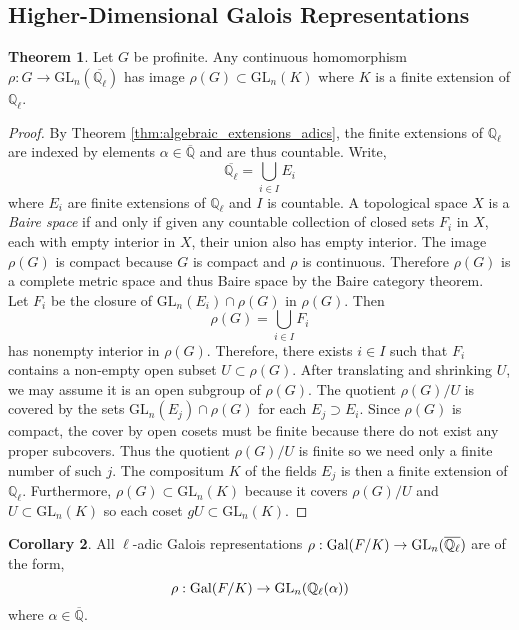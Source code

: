 \documentclass[12pt]{article}
\newcommand{\Q}{\mathbb{Q}}
\newcommand{\Gal}[1]{\mathrm{Gal} \small(#1 \small)}
\newcommand{\GL}[2]{\mathrm{GL}_{#1}(#2)}
\theoremstyle{remark}
\theoremstyle{definition}
\newtheorem{theorem}{Theorem}[section]
\newtheorem{corollary}[theorem]{Corollary}
\begin{document}
\subsection{Higher-Dimensional Galois Representations}

\begin{theorem}
Let $G$ be profinite. Any continuous homomorphism $\rho : G \to \GL{n}{\overline{\Q_{\ell}}}$ has image $\rho(G) \subset \GL{n}{K}$ where $K$ is a finite extension of $\Q_{\ell}$.  
\end{theorem}

\begin{proof}
By Theorem \ref{thm:algebraic_extensions_adics}, the finite extensions of $\Q_{\ell}$ are indexed by elements $\alpha \in \overline{\Q}$ and are thus countable. Write,
\[ \overline{\Q_{\ell}} = \bigcup_{i \in I} E_i \]
where $E_i$ are finite extensions of $\Q_{\ell}$ and $I$ is countable. A topological space $X$ is a \textit{Baire space} if and only if
given any countable collection of closed sets $F_i$ in $X$, each with empty interior in $X$, their union also has empty interior. The image $\rho(G)$ is compact because $G$ is compact and $\rho$ is continuous. Therefore $\rho(G)$ is a complete metric space and thus Baire space by the Baire category theorem. 
\bigskip\\
Let $F_i$ be the closure of $\GL{n}{E_i} \cap \rho(G)$ in $\rho(G)$. Then
\[ \rho(G) = \bigcup_{i \in I} F_i \]
has nonempty interior in $\rho(G)$. Therefore, there exists $i \in I$ such that $F_i$ contains a non-empty open subset $U \subset \rho(G)$. After translating and shrinking $U$, we may assume it is an open subgroup of $\rho(G)$. The
quotient $\rho(G) / U$ is covered by the sets $\GL{n}{E_j} \cap \rho(G)$ for each $E_j \supset E_i$. Since $\rho(G)$ is compact, the cover by open cosets must be finite because there do not exist any proper subcovers. Thus the quotient $\rho(G) / U$ is finite so we need only a finite number of such $j$. The compositum $K$ of the fields $E_j$ is then a finite extension of $\Q_{\ell}$. Furthermore, $\rho(G) \subset \GL{n}{K}$ because it covers $\rho(G) / U$ and $U \subset \GL{n}{K}$ so each coset $g U \subset \GL{n}{K}$.
\end{proof}

\begin{corollary}
All $\ell$-adic Galois representations $\rho : \Gal{F / K} \to \GL{n}{\overline{\Q_{\ell}}}$ are of the form,
\[ \rho : \Gal{F / K} \to \GL{n}{\Q_{\ell}(\alpha)} \]
where $\alpha \in \overline{\Q}$.  
\end{corollary}
\end{document}

